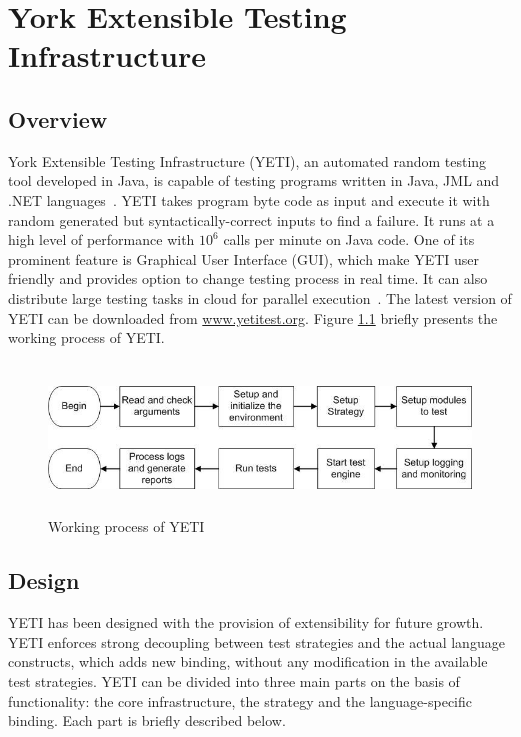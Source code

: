 
\chapter{York Extensible Testing Infrastructure}
\label{chap:yeti_3}




\section{Overview}
York Extensible Testing Infrastructure (YETI), an automated random testing tool developed in Java, is capable of testing programs written in Java, JML and .NET languages~\cite{oriol2010testing}. YETI takes program byte code as input and execute it with random generated but syntactically-correct inputs to find a failure. It runs at a high level of performance with $10^6$ calls per minute on Java code. One of its prominent feature is Graphical User Interface (GUI), which make YETI user friendly and provides option to change testing process in real time. It can also distribute large testing tasks in cloud for parallel execution~\cite{oriol2010yeti}. The latest version of YETI can be downloaded from \url{www.yetitest.org}. Figure \ref{fig:yetiOverview} briefly presents the working process of YETI. 
\bigskip
\begin{figure}[h]
	\centering
	\includegraphics[width=15cm, height=4cm]{chapter3/yetiOverview.png}
	\bigskip
	\caption{Working process of YETI}
	\label{fig:yetiOverview}
\end{figure}


\section{Design}
YETI has been designed with the provision of extensibility for future growth. YETI enforces strong decoupling between test strategies and the actual language constructs, which adds new binding, without any modification in the available test strategies. YETI can be divided into three main parts on the basis of functionality: the core infrastructure, the strategy and the language-specific binding. Each part is briefly described below. 

